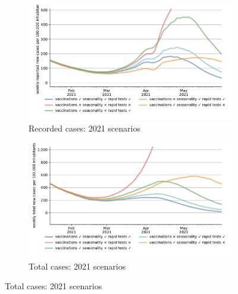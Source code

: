 \begin{figure}[!tp]
    \centering

    \begin{subfigure}[b]{0.475\textwidth}
        \centering
        \includegraphics[width=\textwidth]{../figures/results/figures/scenario_comparisons/one_off_and_combined/full_new_known_case_cropped}
        \caption{{\small Recorded cases: 2021 scenarios}}
        \label{fig:full_new_known_case_cropped}
    \end{subfigure}
    \begin{subfigure}[b]{0.475\textwidth}
        \centering
        \includegraphics[width=\textwidth]{../figures/results/figures/scenario_comparisons/one_off_and_combined/full_newly_infected_cropped}
        \caption{{\small Total cases: 2021 scenarios}}
        \label{fig:full_newly_infected_cropped}
    \end{subfigure}


\end{figure}
